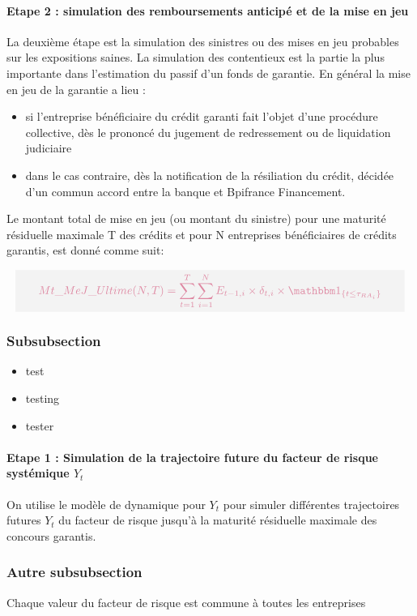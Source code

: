 \documentclass[12pt,a4paper]{report}
\begin{document}
\paragraph{Etape 2 : simulation des remboursements anticipé et de la mise en jeu}

La deuxième étape est la simulation des sinistres ou des mises en jeu probables sur les expositions saines. La simulation des contentieux est la partie la plus importante dans l’estimation du passif d’un fonds de garantie. 
En général la mise en jeu de la garantie  a lieu :
\begin{itemize}
	\item si l’entreprise bénéficiaire du crédit garanti fait l’objet d’une procédure collective, dès le prononcé du jugement de redressement ou de liquidation judiciaire
 	\item dans le cas contraire, dès la notification de la résiliation du crédit, décidée d’un commun accord entre la banque et Bpifrance Financement.
\end{itemize}
 
Le montant total de mise en jeu (ou montant du sinistre) pour une maturité résiduelle maximale T des crédits et pour N entreprises bénéficiaires de crédits garantis, est donné comme suit:

\[
\boxedb{
Mt\_MeJ\_Ultime(N,T) = \sum_{t=1}^T\sum_{i=1}^N E_{t-1,i}\times\delta_{t,i}\times\indic{t\leq \tau_{RA_i}}
}
\]



\subsubsection{Subsubsection}
\lipsum

\begin{itemize}
    \item test
    \item testing
\item tester
\end{itemize}

\paragraph{Etape 1 : Simulation de la trajectoire future du facteur de risque systémique $Y_t$}
On utilise le modèle de dynamique pour $Y_t$ pour simuler différentes trajectoires futures $Y_t$  du facteur de risque jusqu’à la maturité résiduelle maximale des concours garantis. 

\subsubsection{Autre subsubsection}
Chaque valeur du facteur de risque est commune à toutes les entreprises
\end{document}
